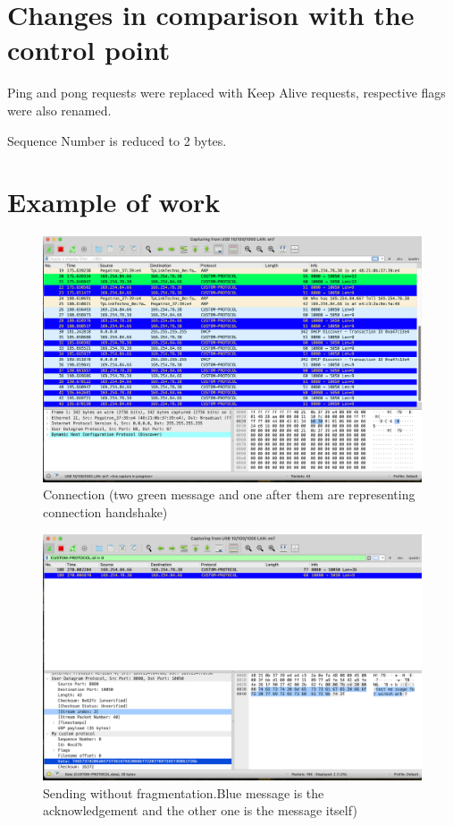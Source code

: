 \documentclass{article}
\begin{document}
\section{Changes in comparison with the control point}
Ping and pong requests were replaced with Keep Alive requests, respective flags were also renamed. 

Sequence Number is reduced to 2 bytes.
\newpage

\section{Example of work}

\begin{figure}[!h]
    \centering
    \includegraphics[width=\textwidth]{images/connect.png}
    \caption{Connection (two green message and one after them are representing connection handshake)}
    \label{fig:mesh1}
\end{figure}


\begin{figure}[!h]
    \centering
    \includegraphics[width=\textwidth]{images/withoutfr.png}
    \caption{Sending without fragmentation.Blue message is the acknowledgement and the other one is the message itself)}
    \label{fig:mesh1}
\end{figure}
\end{document}
